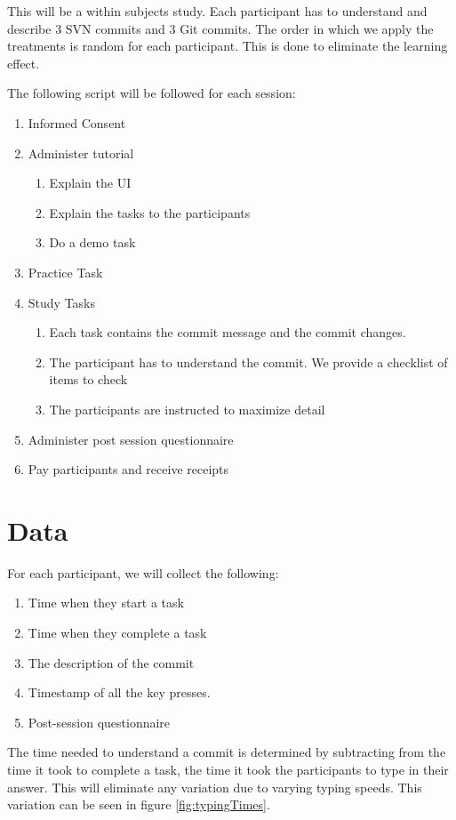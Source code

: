 \documentclass[letterpaper]{article}
\begin{document}
This will be a within subjects study. 
Each participant has to understand and describe 3 SVN commits and 3 Git commits. 
The order in which we apply the treatments is random for each participant. 
This is done to eliminate the learning effect. 

The following script will be followed for each session:
\begin{enumerate}
	\item Informed Consent
	\item Administer tutorial
	\begin{enumerate}
		\item Explain the UI
		\item Explain the tasks to the participants
		\item Do a demo task
	\end{enumerate}
	\item Practice Task
	\item Study Tasks
	\begin{enumerate}
		\item Each task contains the commit message and the commit changes.
		\item The participant has to understand the commit. We provide a checklist of items to check
		\item The participants are instructed to maximize detail
	\end{enumerate}
	\item Administer post session questionnaire
	\item Pay participants and receive receipts 
\end{enumerate}

\section{Data}

For each participant, we will collect the following:
\begin{enumerate}
	\item Time when they start a task
	\item Time when they complete a task
	\item The description of the commit
	\item Timestamp of all the key presses.
	\item Post-session questionnaire
\end{enumerate}

The time needed to understand a commit is determined by subtracting from the time it took to complete a task, the time it took the participants to type in their answer.
This will eliminate any variation due to varying typing speeds.
This variation can be seen in figure \ref{fig:typingTimes}.
\end{document}
